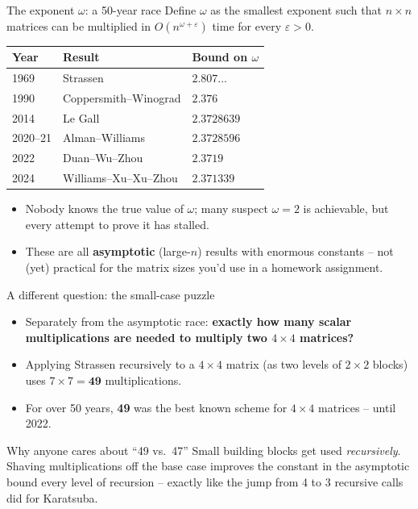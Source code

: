 \documentclass[11pt,aspectratio=169]{beamer}
\begin{document}
\begin{frame}{The exponent $\omega$: a 50-year race}
  Define $\omega$ as the smallest exponent such that $n\times n$ matrices can be
  multiplied in $O(n^{\omega+\varepsilon})$ time for every $\varepsilon > 0$.
  \begin{center}
  \begin{tabular}{@{}lll@{}}
    \toprule
    Year & Result & Bound on $\omega$ \\
    \midrule
    1969 & Strassen & $2.807\ldots$ \\
    1990 & Coppersmith--Winograd & $2.376$ \\
    2014 & Le Gall & $2.3728639$ \\
    2020--21 & Alman--Williams & $2.3728596$ \\
    2022 & Duan--Wu--Zhou & $2.3719$ \\
    2024 & Williams--Xu--Xu--Zhou & $2.371339$ \\
    \bottomrule
  \end{tabular}
  \end{center}
  \begin{itemize}
    \item Nobody knows the true value of $\omega$; many suspect $\omega = 2$ is
    achievable, but every attempt to prove it has stalled.
    \item These are all \textbf{asymptotic} (large-$n$) results with enormous constants --
    not (yet) practical for the matrix sizes you'd use in a homework assignment.
  \end{itemize}
\end{frame}

\begin{frame}{A different question: the small-case puzzle}
  \begin{itemize}
    \item Separately from the asymptotic race: \textbf{exactly how many scalar
    multiplications are needed to multiply two $4\times 4$ matrices?}
    \item Applying Strassen recursively to a $4\times 4$ matrix (as two levels of
    $2\times 2$ blocks) uses $7\times 7 = \mathbf{49}$ multiplications.
    \item For over 50 years, \textbf{49} was the best known scheme for $4\times 4$
    matrices -- until 2022.
  \end{itemize}
  \begin{block}{Why anyone cares about ``49 vs.\ 47''}
    Small building blocks get used \emph{recursively}. Shaving multiplications off the
    base case improves the constant in the asymptotic bound every level of recursion --
    exactly like the jump from 4 to 3 recursive calls did for Karatsuba.
  \end{block}
\end{frame}
\end{document}
